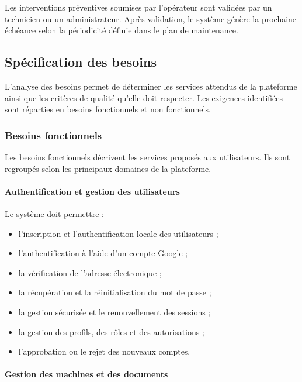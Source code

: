 Les interventions préventives soumises par l’opérateur sont validées par un technicien ou un administrateur. Après validation, le système génère la prochaine échéance selon la périodicité définie dans le plan de maintenance.



\subsection{Spécification des besoins}

L’analyse des besoins permet de déterminer les services attendus de la plateforme ainsi que les critères de qualité qu’elle doit respecter. Les exigences identifiées sont réparties en besoins fonctionnels et non fonctionnels.

\subsubsection{Besoins fonctionnels}

Les besoins fonctionnels décrivent les services proposés aux utilisateurs. Ils sont regroupés selon les principaux domaines de la plateforme.

\paragraph{Authentification et gestion des utilisateurs}

Le système doit permettre :

\begin{itemize}
    \item l’inscription et l’authentification locale des utilisateurs ;
    \item l’authentification à l’aide d’un compte Google ;
    \item la vérification de l’adresse électronique ;
    \item la récupération et la réinitialisation du mot de passe ;
    \item la gestion sécurisée et le renouvellement des sessions ;
    \item la gestion des profils, des rôles et des autorisations ;
    \item l’approbation ou le rejet des nouveaux comptes.
\end{itemize}

\paragraph{Gestion des machines et des documents}

